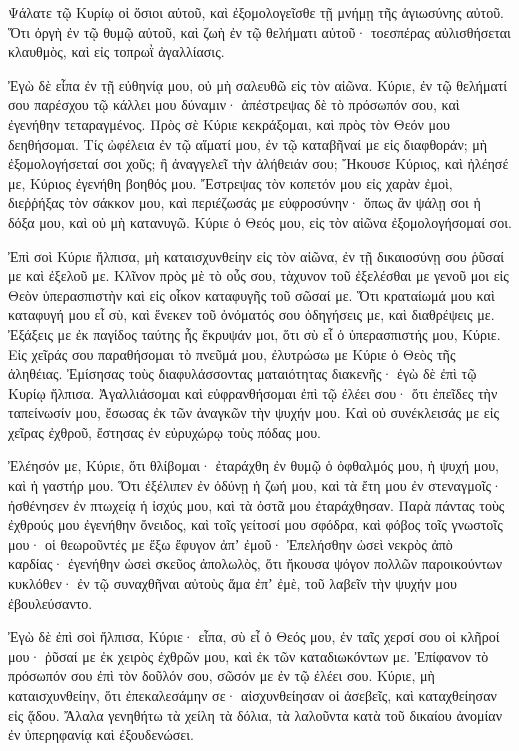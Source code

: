 \begin{spacing}{1.1}
\begin{multicols}{2}
Ψάλατε τῷ Κυρίῳ οἱ ὅσιοι αὐτοῦ, καὶ ἐξομολογεῖσθε τῇ μνήμῃ τῆς ἁγιωσύνης αὐτοῦ.
Ὅτι ὀργὴ ἐν τῷ θυμῷ αὐτοῦ, καὶ ζωὴ ἐν τῷ θελήματι αὐτοῦ· τοεσπέρας αὐλισθήσεται κλαυθμὸς, καὶ εἰς τοπρωῒ ἀγαλλίασις.

Ἐγὼ δὲ εἶπα ἐν τῇ εὐθηνίᾳ μου, οὐ μὴ σαλευθῶ εἰς τὸν αἰῶνα.
Κύριε, ἐν τῷ θελήματί σου παρέσχου τῷ κάλλει μου δύναμιν· ἀπέστρεψας δὲ τὸ πρόσωπόν σου, καὶ ἐγενήθην τεταραγμένος.
Πρὸς σὲ Κύριε κεκράξομαι, καὶ πρὸς τὸν Θεόν μου δεηθήσομαι.
Τίς ὠφέλεια ἐν τῷ αἵματί μου, ἐν τῷ καταβῆναί με εἰς διαφθοράν; μὴ ἐξομολογήσεταί σοι χοῦς; ἢ ἀναγγελεῖ τὴν ἀλήθειάν σου;
Ἤκουσε Κύριος, καὶ ἠλέησέ με, Κύριος ἐγενήθη βοηθός μου.
Ἔστρεψας τὸν κοπετόν μου εἰς χαρὰν ἐμοὶ, διεῤῥήξας τὸν σάκκον μου, καὶ περιέζωσάς με εὐφροσύνην·
ὅπως ἂν ψάλῃ σοι ἡ δόξα μου, καὶ οὐ μὴ κατανυγῶ. Κύριε ὁ Θεός μου, εἰς τὸν αἰῶνα ἐξομολογήσομαί σοι.

Ἐπὶ σοὶ Κύριε ἤλπισα, μὴ καταισχυνθείην εἰς τὸν αἰῶνα, ἐν τῇ δικαιοσύνῃ σου ῥῦσαί με καὶ ἐξελοῦ με.
Κλῖνον πρὸς μὲ τὸ οὖς σου, τὰχυνον τοῦ ἐξελέσθαι με γενοῦ μοι εἰς Θεὸν ὑπερασπιστὴν καὶ εἰς οἶκον καταφυγῆς τοῦ σῶσαί με.
Ὅτι κραταίωμά μου καὶ καταφυγή μου εἶ σὺ, καὶ ἕνεκεν τοῦ ὀνόματός σου ὁδηγήσεις με, καὶ διαθρέψεις με.
Ἐξάξεις με ἐκ παγίδος ταύτης ἧς ἔκρυψάν μοι, ὅτι σὺ εἶ ὁ ὑπερασπιστής μου, Κύριε.
Εἰς χεῖράς σου παραθήσομαι τὸ πνεῦμά μου, ἐλυτρώσω με Κύριε ὁ Θεὸς τῆς ἀληθέιας.
Ἐμίσησας τοὺς διαφυλάσσοντας ματαιότητας διακενῆς· ἐγὼ δὲ ἐπὶ τῷ Κυρίῳ ἤλπισα.
Ἀγαλλιάσομαι καὶ εὐφρανθήσομαι ἐπὶ τῷ ἐλέει σου· ὅτι ἐπεῖδες τὴν ταπείνωσίν μου, ἔσωσας ἐκ τῶν ἀναγκῶν τὴν ψυχήν μου.
Καὶ οὐ συνέκλεισάς με εἰς χεῖρας ἐχθροῦ, ἔστησας ἐν εὐρυχώρῳ τοὺς πόδας μου.

Ἐλέησόν με, Κύριε, ὅτι θλίβομαι· ἐταράχθη ἐν θυμῷ ὁ ὀφθαλμός μου, ἡ ψυχή μου, καὶ ἡ γαστήρ μου.
Ὅτι ἐξέλιπεν ἐν ὀδύνῃ ἡ ζωή μου, καὶ τὰ ἔτη μου ἐν στεναγμοῖς· ἠσθένησεν ἐν πτωχείᾳ ἡ ἰσχύς μου, καὶ τὰ ὀστᾶ μου ἐταράχθησαν.
Παρὰ πάντας τοὺς ἐχθρούς μου ἐγενήθην ὄνειδος, καὶ τοῖς γείτοσί μου σφόδρα, καὶ φόβος τοῖς γνωστοῖς μου· οἱ θεωροῦντές με ἔξω ἔφυγον ἀπʼ ἐμοῦ·
Ἐπελήσθην ὡσεὶ νεκρὸς ἀπὸ καρδίας· ἐγενήθην ὡσεὶ σκεῦος ἀπολωλὸς,
ὅτι ἤκουσα ψόγον πολλῶν παροικούντων κυκλόθεν· ἐν τῷ συναχθῆναι αὐτοὺς ἅμα ἐπʼ ἐμὲ, τοῦ λαβεῖν τὴν ψυχήν μου ἐβουλεύσαντο.

Ἐγὼ δὲ ἐπὶ σοὶ ἤλπισα, Κύριε· εἶπα, σὺ εἶ ὁ Θεός μου,
ἐν ταῖς χερσί σου οἱ κλῆροί μου· ῥῦσαί με ἐκ χειρὸς ἐχθρῶν μου, καὶ ἐκ τῶν καταδιωκόντων με.
Ἐπίφανον τὸ πρόσωπόν σου ἐπὶ τὸν δοῦλόν σου, σῶσόν με ἐν τῷ ἐλέει σου.
Κύριε, μὴ καταισχυνθείην, ὅτι ἐπεκαλεσάμην σε· αἰσχυνθείησαν οἱ ἀσεβεῖς, καὶ καταχθείησαν εἰς ᾅδου.
Ἄλαλα γενηθήτω τὰ χείλη τὰ δόλια, τὰ λαλοῦντα κατὰ τοῦ δικαίου ἀνομίαν ἐν ὑπερηφανίᾳ καὶ ἐξουδενώσει.


\end{multicols}
\end{spacing}
